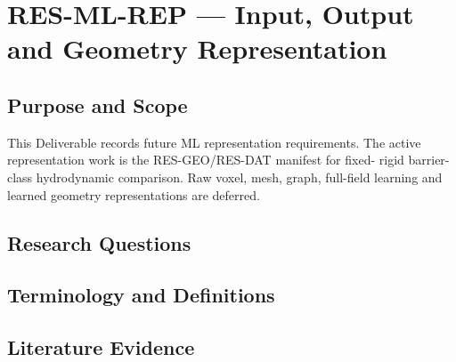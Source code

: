 
\section{RES-ML-REP --- Input, Output and Geometry Representation}
\label{sec:res-ml-rep}

\subsection{Purpose and Scope}
\label{sec:res-ml-rep-purpose}

This Deliverable records future ML representation requirements. The
active representation work is the RES-GEO/RES-DAT manifest for fixed-
rigid barrier-class hydrodynamic comparison. Raw voxel, mesh, graph,
full-field learning and learned geometry representations are deferred.

\subsection{Research Questions}
\label{sec:res-ml-rep-research-questions}


\subsection{Terminology and Definitions}
\label{sec:res-ml-rep-definitions}


\subsection{Literature Evidence}
\label{sec:res-ml-rep-literature-evidence}

%

